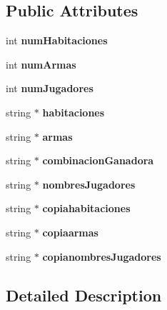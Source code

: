 \subsection*{Public Attributes}
\begin{DoxyCompactItemize}
\item 
\mbox{\label{class_cartas_a05eaec758fa05ff9beedf7b4a941e5e5}} 
int {\bfseries num\+Habitaciones}
\item 
\mbox{\label{class_cartas_a63037bda16092d2f60d4e599e1c004da}} 
int {\bfseries num\+Armas}
\item 
\mbox{\label{class_cartas_ac6382cda20bf230e57d13096aa9d8c15}} 
int {\bfseries num\+Jugadores}
\item 
\mbox{\label{class_cartas_ae1f6695611fa995ec088914c8b1c28dd}} 
string $\ast$ {\bfseries habitaciones}
\item 
\mbox{\label{class_cartas_af71c0f4a70823846c10f40655ddeb067}} 
string $\ast$ {\bfseries armas}
\item 
\mbox{\label{class_cartas_afa91fbaf91070eef3e7baa7dab882485}} 
string $\ast$ {\bfseries combinacion\+Ganadora}
\item 
\mbox{\label{class_cartas_aef2fbdeb00bee77ac884f9def1e212f8}} 
string $\ast$ {\bfseries nombres\+Jugadores}
\item 
\mbox{\label{class_cartas_a00017fd1cd703f5c7433003b4296345b}} 
string $\ast$ {\bfseries copiahabitaciones}
\item 
\mbox{\label{class_cartas_a16ac112d41f62a5f50eccc032afc58e6}} 
string $\ast$ {\bfseries copiaarmas}
\item 
\mbox{\label{class_cartas_a40baee6f6fd6a5fdaf4622eadce299fd}} 
string $\ast$ {\bfseries copianombres\+Jugadores}
\end{DoxyCompactItemize}


\subsection{Detailed Description}


